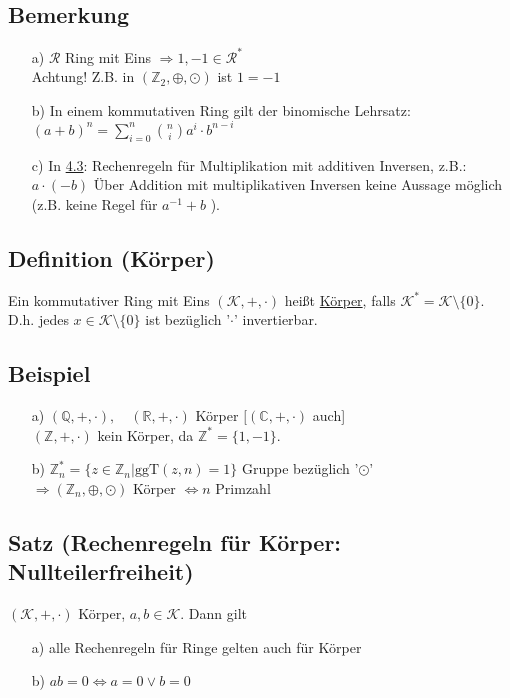\documentclass[12pt,titlepage, pdf]{article}
\newcommand{\uline}[1]{\underline{#1}}
\renewcommand{\>}{\rightarrow}
\renewcommand{\*}{\cdot}
\begin{document}
\subsection{Bemerkung}
\begin{itemize}
	\item[a)] $\mathcal{R}$ Ring mit Eins $\Rightarrow 1, -1 \in \mathcal{R}^*$ \\
	Achtung! Z.B. in $(\mathbb{Z}_2, \oplus, \odot)$ ist $1 = -1$
	\item[b)] In einem kommutativen Ring gilt der binomische Lehrsatz:\\
	$(a+b)^n = \sum_{i = 0}^{n} {n\choose{i}} a^i \cdot b^{n-i}$
	\item[c)] In \hyperref[4.3]{4.3}: Rechenregeln für Multiplikation mit additiven Inversen, z.B.: $a\cdot(-b)$ Über Addition mit multiplikativen Inversen keine Aussage möglich (z.B. keine Regel für $a^{-1}+b$ ).
\end{itemize}

\subsection{Definition (Körper)}
Ein kommutativer Ring mit Eins $(\mathcal{K}, +, \cdot)$ heißt \uline{Körper}, falls $\mathcal{K}^* = \mathcal{K} \setminus \{0\}$. D.h. jedes $x \in \mathcal{K} \setminus \{0\}$ ist bezüglich '$\cdot$' invertierbar.

\subsection{Beispiel}
\begin{itemize}
	\item[a)] $(\mathbb{Q},+,\cdot),\quad (\mathbb{R},+,\cdot)$ Körper $[(\mathbb{C},+,\cdot)$ auch] \\
	$(\mathbb{Z},+,\cdot)$ kein Körper, da $\mathbb{Z}^* = \{1,-1\}$.
	\item[b)] $\mathbb{Z}_n^* = \{z \in \mathbb{Z}_n| \text{ggT}(z,n) = 1\}$ Gruppe bezüglich '$\odot$'\\
	$\Rightarrow (\mathbb{Z}_n, \oplus, \odot)$ Körper $\Leftrightarrow n$ Primzahl
\end{itemize}

\subsection{Satz (Rechenregeln für Körper: Nullteilerfreiheit)}
\label{4.7}	
$(\mathcal{K},+,\cdot)$ Körper, $a,b \in \mathcal{K}$. Dann gilt
\begin{itemize}
	\item[a)] alle Rechenregeln für Ringe gelten auch für Körper
	\item[b)] $ab = 0 \Leftrightarrow a = 0\vee b = 0$ \qquad [Gegenbeispiel: $(\mathbb{Z}_6, \oplus, \odot)$, weil $2 \odot 3 = 0$]
\end{itemize}
\end{document}
